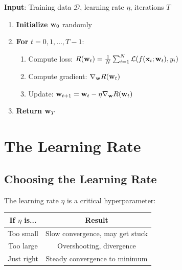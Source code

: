 \begin{tcolorbox}[title=Gradient Descent Algorithm]
\textbf{Input}: Training data $\mathcal{D}$, learning rate $\eta$, iterations $T$

\begin{enumerate}
    \item \textbf{Initialize} $\mathbf{w}_0$ randomly
    \item \textbf{For} $t = 0, 1, \ldots, T-1$:
    \begin{enumerate}
        \item Compute loss: $R(\mathbf{w}_t) = \frac{1}{N} \sum_{i=1}^{N} \mathcal{L}(f(\mathbf{x}_i; \mathbf{w}_t), y_i)$
        \item Compute gradient: $\nabla_{\mathbf{w}} R(\mathbf{w}_t)$
        \item Update: $\mathbf{w}_{t+1} = \mathbf{w}_t - \eta \nabla_{\mathbf{w}} R(\mathbf{w}_t)$
    \end{enumerate}
    \item \textbf{Return} $\mathbf{w}_T$
\end{enumerate}
\end{tcolorbox}


\section{The Learning Rate}

\subsection{Choosing the Learning Rate}

The learning rate $\eta$ is a critical hyperparameter:

\begin{center}
\begin{tabular}{|c|c|}
\hline
\textbf{If $\eta$ is...} & \textbf{Result} \\ \hline
Too small & Slow convergence, may get stuck \\ \hline
Too large & Overshooting, divergence \\ \hline
Just right & Steady convergence to minimum \\ \hline
\end{tabular}
\end{center}

